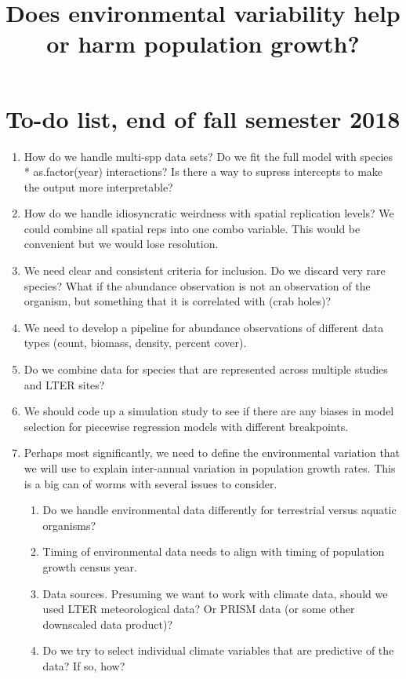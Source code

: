 \documentclass{article}
\title{Does environmental variability help or harm population growth?}
\begin{document}
  \maketitle

\section{To-do list, end of fall semester 2018}
\begin{enumerate}
\item{How do we handle multi-spp data sets? Do we fit the full model with species * as.factor(year) interactions? Is there a way to supress intercepts to make the output more interpretable?}
\item{How do we handle idiosyncratic weirdness with spatial replication levels? We could combine all spatial reps into one combo variable. This would be convenient but we would lose resolution.}
\item{We need clear and consistent criteria for inclusion. Do we discard very rare species? What if the abundance observation is not an observation of the organism, but something that it is correlated with (crab holes)?}
\item{We need to develop a pipeline for abundance observations of different data types (count, biomass, density, percent cover).}
\item{Do we combine data for species that are represented across multiple studies and LTER sites?}
\item{We should code up a simulation study to see if there are any biases in model selection for piecewise regression models with different breakpoints.}
\item{Perhaps most significantly, we need to define the environmental variation that we will use to explain inter-annual variation in population growth rates. This is a big can of worms with several issues to consider.}
\begin{enumerate}
\item{Do we handle environmental data differently for terrestrial versus aquatic organisms?}
\item{Timing of environmental data needs to align with timing of population growth census year.}
\item{Data sources. Presuming we want to work with climate data, should we used LTER meteorological data? Or PRISM data (or some other downscaled data product)?}
\item{Do we try to select individual climate variables that are predictive of the data? If so, how?}

\end{enumerate}
\end{enumerate}
\end{document}
